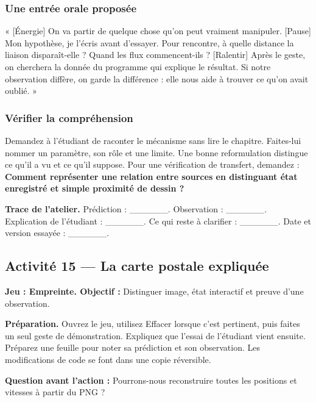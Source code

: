 \documentclass[
  canadien,
  11pt,
  letterpaper,
]{article}
\begin{document}
\subsubsection{Une entrée orale
proposée}\label{une-entruxe9e-orale-proposuxe9e-13}

« {[}Énergie{]} On va partir de quelque chose qu'on peut vraiment
manipuler. {[}Pause{]} Mon hypothèse, je l'écris avant d'essayer. Pour
rencontre, à quelle distance la liaison disparaît-elle ? Quand les flux
commencent-ils ? {[}Ralentir{]} Après le geste, on cherchera la donnée
du programme qui explique le résultat. Si notre observation diffère, on
garde la différence : elle nous aide à trouver ce qu'on avait oublié. »

\subsubsection{Vérifier la
compréhension}\label{vuxe9rifier-la-compruxe9hension-13}

Demandez à l'étudiant de raconter le mécanisme sans lire le chapitre.
Faites-lui nommer un paramètre, son rôle et une limite. Une bonne
reformulation distingue ce qu'il a vu et ce qu'il suppose. Pour une
vérification de transfert, demandez : \textbf{Comment représenter une
relation entre sources en distinguant état enregistré et simple
proximité de dessin ?}

\textbf{Trace de l'atelier.} Prédiction : \_\_\_\_\_\_. Observation :
\_\_\_\_\_\_. Explication de l'étudiant : \_\_\_\_\_\_. Ce qui reste à
clarifier : \_\_\_\_\_\_. Date et version essayée : \_\_\_\_\_\_.

\subsection{Activité 15 --- La carte postale
expliquée}\label{activituxe9-15-la-carte-postale-expliquuxe9e}

\textbf{Jeu : Empreinte. Objectif :} Distinguer image, état interactif
et preuve d'une observation.

\textbf{Préparation.} Ouvrez le jeu, utilisez Effacer lorsque c'est
pertinent, puis faites un seul geste de démonstration. Expliquez que
l'essai de l'étudiant vient ensuite. Préparez une feuille pour noter sa
prédiction et son observation. Les modifications de code se font dans
une copie réversible.

\textbf{Question avant l'action :} Pourrons-nous reconstruire toutes les
positions et vitesses à partir du PNG ?
\end{document}

